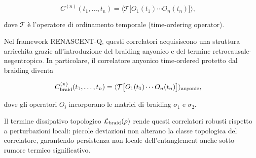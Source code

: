 \documentclass[11pt,a4paper]{article}
\theoremstyle{plain}
\theoremstyle{definition}
\begin{document}
\begin{tcolorbox}[
  colback=blue!3!white, 
  colframe=blue!80!black, 
  title=Correlatore time-ordered generale, 
  fonttitle=\bfseries,
  breakable,
  enhanced,
  width=\textwidth,
  boxrule=0.9pt,
  arc=6pt
]
\begin{equation}
C^{(n)}(t_1,\dots,t_n) = \langle \mathcal{T} \bigl[ O_1(t_1) \cdots O_n(t_n) \bigr] \rangle,
\label{eq:time_ordered_general}
\end{equation}
\end{tcolorbox}

\vspace{0.4cm}

dove $\mathcal{T}$ è l'operatore di ordinamento temporale (time-ordering operator).

\vspace{0.5cm}

Nel framework RENASCENT-Q, questi correlatori acquisiscono una struttura arricchita grazie all'introduzione del braiding anyonico e del termine retrocausale-negentropico. In particolare, il correlatore anyonico time-ordered protetto dal braiding diventa

\vspace{0.3cm}

\begin{tcolorbox}[
  colback=violet!3!white, 
  colframe=violet!70!black, 
  title=Correlatore anyonico time-ordered protetto, 
  fonttitle=\bfseries,
  breakable,
  enhanced,
  width=\textwidth,
  boxrule=0.9pt,
  arc=6pt
]
\begin{equation}
C_{\rm braid}^{(n)}(t_1,\dots,t_n) = \langle \mathcal{T} \bigl[ O_1(t_1) \cdots O_n(t_n) \bigr] \rangle_{\rm anyonic},
\label{eq:braid_correlator}
\end{equation}
\end{tcolorbox}

\vspace{0.4cm}

dove gli operatori $O_i$ incorporano le matrici di braiding $\sigma_1$ e $\sigma_2$. 

\vspace{0.6cm}

Il termine dissipativo topologico $\mathcal{L}_{\rm braid}(\rho)$ rende questi correlatori robusti rispetto a perturbazioni locali: piccole deviazioni non alterano la classe topologica del correlatore, garantendo persistenza non-locale dell'entanglement anche sotto rumore termico significativo.

\vspace{0.5cm}
\end{document}
